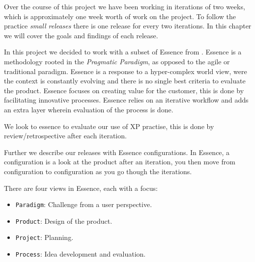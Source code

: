 Over the course of this project we have been working in iterations of two weeks, which is approximately one week worth of work on the project. To follow the practice \textit{small releases} there is one release for every two iterations. In this chapter we will cover the goals and findings of each release.

In this project we decided to work with a subset of Essence from \citet{essence:config}. Essence is a methodology rooted in the \textit{Pragmatic Paradigm}, as opposed to the agile or traditional paradigm. Essence is a response to a hyper-complex world view, were the context is constantly evolving and there is no single best criteria to evaluate the product. Essence focuses on creating value for the customer, this is done by facilitating innovative processes. Essence relies on an iterative workflow and adds an extra layer wherein evaluation of the process is done. 

We look to essence to evaluate our use of XP practise, this is done by review/retrospective after each iteration.

Further we describe our releases with Essence configurations. In Essence, a configuration is a look at the product after an iteration, you then move from configuration to configuration as you go though the iterations. 

There are four views in Essence, each with a focus: 
\begin{itemize}
\item \texttt{Paradigm}: Challenge from a user perspective.
\item \texttt{Product}: Design of the product.
\item \texttt{Project}: Planning.
\item \texttt{Process}: Idea development and evaluation.
\end{itemize}



